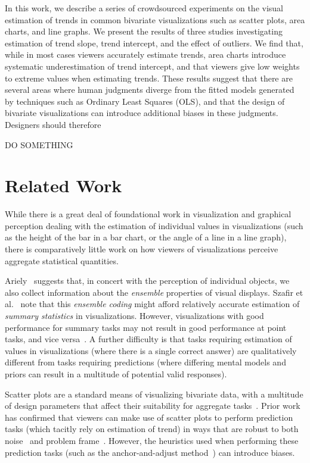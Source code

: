 \documentclass{sigchi}
\begin{document}
In this work, we describe a series of crowdsourced experiments on the visual estimation of trends in common bivariate visualizations such as scatter plots, area charts, and line graphs. We present the results of three studies investigating estimation of trend slope, trend intercept, and the effect of outliers. We find that, while in most cases viewers accurately estimate trends, area charts introduce systematic underestimation of trend intercept, and that viewers give low weights to extreme values when estimating trends. These results suggest that there are several areas where human judgments diverge from the fitted models generated by techniques such as Ordinary Least Squares (OLS), and that the design of bivariate visualizations can introduce additional biases in these judgments. Designers should therefore 

DO SOMETHING

\section{Related Work}

While there is a great deal of foundational work in visualization and graphical perception dealing with the estimation of individual values in visualizations (such as the height of the bar in a bar chart, or the angle of a line in a line graph), there is comparatively little work on how viewers of visualizations perceive aggregate statistical quantities.

Ariely~\cite{ariely2001seeing} suggests that, in concert with the perception of individual objects, we also collect information about the \emph{ensemble} properties of visual displays. Szafir et al.~\cite{szafir2016four} note that this \emph{ensemble coding} might afford relatively accurate estimation of \emph{summary statistics} in visualizations. However, visualizations with good performance for summary tasks may not result in good performance at point tasks, and vice versa~\cite{albers2014task,fuchs2013evaluation}. A further difficulty is that tasks requiring estimation of values in visualizations (where there is a single correct answer) are qualitatively different from tasks requiring predictions (where differing mental models and priors can result in a multitude of potential valid responses).

Scatter plots are a standard means of visualizing bivariate data, with a multitude of design parameters that affect their suitability for aggregate tasks~\cite{cleveland1984many}. Prior work has confirmed that viewers can make use of scatter plots to perform prediction tasks (which tacitly rely on estimation of trend) in ways that are robust to both noise~\cite{harvey1997effects} and problem frame~\cite{lewandowsky2011popular}. However, the heuristics used when performing these prediction tasks (such as the anchor-and-adjust method~\cite{bolger1993context}) can introduce biases.
\end{document}
